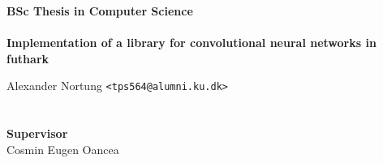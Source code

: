 \documentclass{article}
\begin{document}
    \thispagestyle{empty}
    \begin{adjustwidth}{-3cm}{-1.5cm}
    \vspace*{-1cm}
    \textbf{\Huge BSc Thesis in Computer Science} \\
    \vspace*{2.5cm} \\
    \textbf{\large Implementation of a library for convolutional neural networks in futhark} \\
    \begin{tabbing}
    Alexander Nortung \hspace{1cm} \= \texttt{<tps564@alumni.ku.dk>} \\
    \\
    \\[12cm]
    \textbf{\Large Supervisor} \\
    Cosmin Eugen Oancea \\
    \end{tabbing}
    \end{adjustwidth}
    \newpage
    \ClearWallPaper



\tableofcontents















\printbibliography
\end{document}
